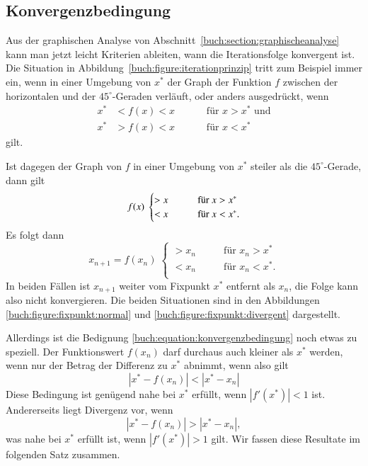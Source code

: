 %
%
\subsection{Konvergenzbedingung
\label{buch:iteration:subsection:konvergenzbedingung}}


Aus der graphischen Analyse von Abschnitt~\ref{buch:section:graphischeanalyse}
kann man jetzt leicht Kriterien ableiten, wann die Iterationsfolge
konvergent ist.
Die Situation in Abbildung~\ref{buch:figure:iterationprinzip}
tritt zum Beispiel immer ein, wenn in einer Umgebung von $x^*$ 
der Graph der Funktion $f$ zwischen der horizontalen und der 
$45^\circ$-Geraden verläuft, oder anders ausgedrückt, wenn
\[
\begin{aligned}
x^* &< f(x) < x &&& &\text{für $x>x^*$ und} \\
x^* &> f(x) < x &&& &\text{für $x<x^*$}
\end{aligned}
\]
gilt.

Ist dagegen der Graph von $f$ in einer Umgebung von $x^*$ steiler als
die $45^\circ$-Gerade, dann gilt 
\begin{equation}
f(x) \;\begin{cases}
> x&\qquad\text{für $ x>x^*$}\\
< x&\qquad\text{für $ x<x^*$.}
\end{cases}
\label{buch:equation:konvergenzbedingung}
\end{equation}
Es folgt dann
\[
x_{n+1} = f(x_n)
\;
\begin{cases}
> x_n&\qquad \text{für $x_n>x^*$}\\
< x_n&\qquad \text{für $x_n<x^*$.}\\
\end{cases}
\]
In beiden Fällen ist $x_{n+1}$ weiter vom Fixpunkt $x^*$ entfernt
als $x_n$, die Folge kann also nicht konvergieren.
Die beiden Situationen sind in den Abbildungen
\ref{buch:figure:fixpunkt:normal} und
\ref{buch:figure:fixpunkt:divergent}
dargestellt.

Allerdings ist die Bedignung \ref{buch:equation:konvergenzbedingung}
noch etwas zu speziell.
Der Funktionswert $f(x_n)$ darf durchaus auch kleiner als $x^*$ werden,
wenn nur der Betrag der Differenz zu $x^*$ abnimmt, wenn also gilt
\begin{equation}
|x^* - f(x_n)| < |x^*-x_n|
\label{buch:equation:konvergenzbereich}
\end{equation}
Diese Bedingung ist genügend nahe bei $x^*$ erfüllt, wenn
$|f'(x^*)| < 1$ ist.
Andererseits liegt Divergenz vor, wenn 
\[
|x^* - f(x_n)| > |x^*-x_n|,
\]
was nahe bei $x^*$ erfüllt ist, wenn $|f'(x^*)|>1$ gilt.
Wir fassen diese Resultate im folgenden Satz zusammen.

